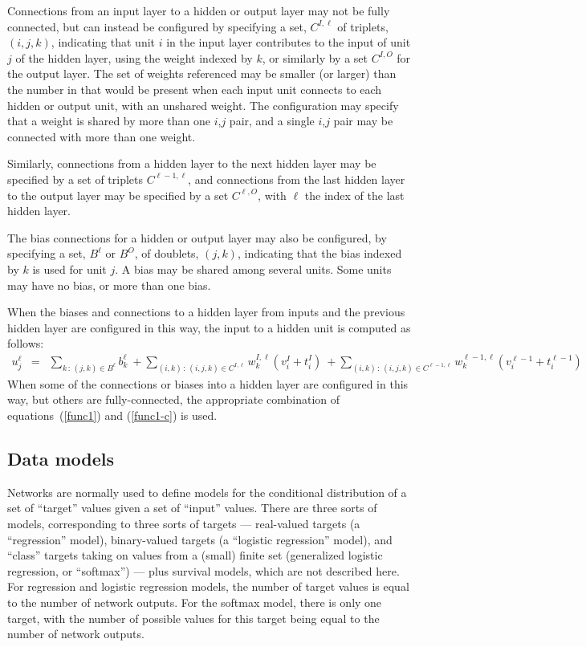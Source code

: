 \documentclass{report}[11pt]
\def\beq{\begin{eqnarray}}
\def\eeq{\end{eqnarray}}
\begin{document}
Connections from an input layer to a hidden or output layer may not be
fully connected, but can instead be configured by specifying a set,
$C^{I,\ell}$ of triplets, $(i,j,k)$, indicating that unit $i$ in the
input layer contributes to the input of unit $j$ of the hidden layer,
using the weight indexed by $k$, or similarly by a set $C^{I,O}$ for
the output layer.  The set of weights referenced may be smaller (or
larger) than the number in that would be present when each input unit
connects to each hidden or output unit, with an unshared weight.  The
configuration may specify that a weight is shared by more than one
$i$,$j$ pair, and a single $i$,$j$ pair may be connected with more
than one weight.  

Similarly, connections from a hidden layer to the next hidden layer
may be specified by a set of triplets $C^{\ell\!-\!1,\ell}$, and
connections from the last hidden layer to the output layer may be
specified by a set $C^{\ell,O}$, with $\ell$ the index of the last
hidden layer.

The bias connections for a hidden or output layer may also be
configured, by specifying a set, $B^{\ell}$ or $B^O$, of doublets,
$(j,k)$, indicating that the bias indexed by $k$ is used for unit $j$.
A bias may be shared among several units. Some units may have no bias,
or more than one bias.

When the biases and connections to a hidden layer from inputs and the
previous hidden layer are configured in this way, the input to a hidden
unit is computed as follows:
\beq
  u^{\ell}_j & = & 
         \sum_{k\,:\, (j,k)\in B^{\ell}}\!\!\!\!\!\!
                        b^{\ell}_k \ +\!\!\!
         \sum_{(i,k)\,:\, (i,j,k)\in C^{I,\ell}}\!\!\!\!\!\!
                        w^{I,\ell}_k (v^I_i+t^I_i) \ +\!\!\!
         \sum_{(i,k)\,:\, (i,j,k)\in C^{\ell\!-\!1,\ell}}\!\!\!\!\!\!
               w^{\ell-1,\ell}_k (v^{\ell-1}_i+t^{\ell-1}_i)
\label{func1-c}\eeq%
When some of the connections or biases into a hidden layer are
configured in this way, but others are fully-connected, the
appropriate combination of equations~(\ref{func1}) and (\ref{func1-c})
is used.


\subsection*{Data models}\label{app-sec-models}

Networks are normally used to define models for the conditional
distribution of a set of ``target'' values given a set of ``input''
values.  There are three sorts of models, corresponding to three sorts
of targets --- real-valued targets (a ``regression'' model),
binary-valued targets (a ``logistic regression'' model), and ``class''
targets taking on values from a (small) finite set (generalized
logistic regression, or ``softmax'') --- plus survival models, which
are not described here.  For regression and logistic regression
models, the number of target values is equal to the number of network
outputs.  For the softmax model, there is only one target, with the
number of possible values for this target being equal to the number of
network outputs.
\end{document}
